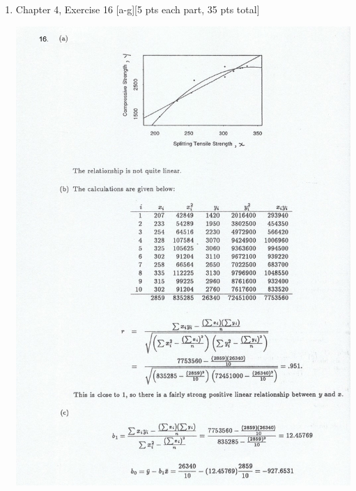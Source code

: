 \documentclass[11pt]{article}\usepackage[]{graphicx}\usepackage[]{color}
\begin{document}
\begin{enumerate}
 \item Chapter 4, Exercise 16 [a-g][5 pts each part, 35 pts total]

    	\begin{center}
    	\begin{minipage}{\linewidth}
    		\centering
    		\includegraphics[width=\textwidth]{hw5-2-1.JPG}
    	\end{minipage}
    \end{center}
    	\begin{center}
    	\begin{minipage}{\linewidth}
    		\centering

\end{minipage}
\end{center}
\end{enumerate}
\end{document}
